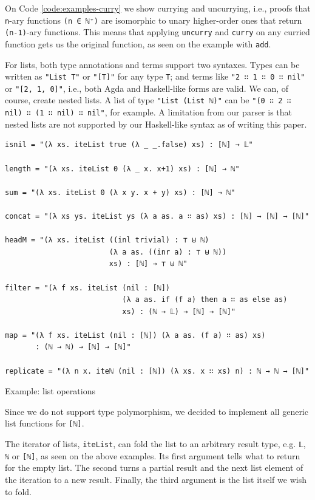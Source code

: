 On Code \ref{code:examples-curry} we show currying and uncurrying, i.e., proofs that \verb$n$-ary functions \verb$(n ∈ ℕ⁺)$ are isomorphic to unary higher-order ones that return \verb$(n-1)$-ary functions. This means that applying \verb$uncurry$ and \verb$curry$ on any curried function gets us the original function, as seen on the example with \verb$add$.

For lists, both type annotations and terms support two syntaxes. Types can be written as \verb$"List T"$ or \verb$"[T]"$ for any type \verb$T$; and terms like \verb$"2 ∷ 1 ∷ 0 ∷ nil"$ or \verb$"[2, 1, 0]"$, i.e., both Agda and Haskell-like forms are valid. We can, of course, create nested lists. A list of type \verb$"List (List ℕ)"$ can be \verb$"(0 ∷ 2 ∷ nil) ∷ (1 ∷ nil) ∷ nil"$, for example. A limitation from our parser is that nested lists are not supported by our Haskell-like syntax as of writing this paper.

\begin{listing}[H]
\begin{verbatim}
isnil = "(λ xs. iteList true (λ _ _.false) xs) : [ℕ] → 𝕃"

length = "(λ xs. iteList 0 (λ _ x. x+1) xs) : [ℕ] → ℕ"

sum = "(λ xs. iteList 0 (λ x y. x + y) xs) : [ℕ] → ℕ"

concat = "(λ xs ys. iteList ys (λ a as. a ∷ as) xs) : [ℕ] → [ℕ] → [ℕ]"

headM = "(λ xs. iteList ((inl trivial) : ⊤ ⊎ ℕ)
                        (λ a as. ((inr a) : ⊤ ⊎ ℕ))
                        xs) : [ℕ] → ⊤ ⊎ ℕ"

filter = "(λ f xs. iteList (nil : [ℕ])
                           (λ a as. if (f a) then a ∷ as else as)
                           xs) : (ℕ → 𝕃) → [ℕ] → [ℕ]"

map = "(λ f xs. iteList (nil : [ℕ]) (λ a as. (f a) ∷ as) xs)
       : (ℕ → ℕ) → [ℕ] → [ℕ]"

replicate = "(λ n x. iteℕ (nil : [ℕ]) (λ xs. x ∷ xs) n) : ℕ → ℕ → [ℕ]"
\end{verbatim}
\caption{Example: list operations}
\label{code:examples-lists}
\end{listing}

Since we do not support type polymorphism, we decided to implement all generic list functions for \verb$[ℕ]$.

The iterator of lists, \verb$iteList$, can fold the list to an arbitrary result type, e.g. \verb$𝕃$, \verb$ℕ$ or \verb$[ℕ]$, as seen on the above examples. Its first argument tells what to return for the empty list. The second turns a partial result and the next list element of the iteration to a new result. Finally, the third argument is the list itself we wish to fold.

